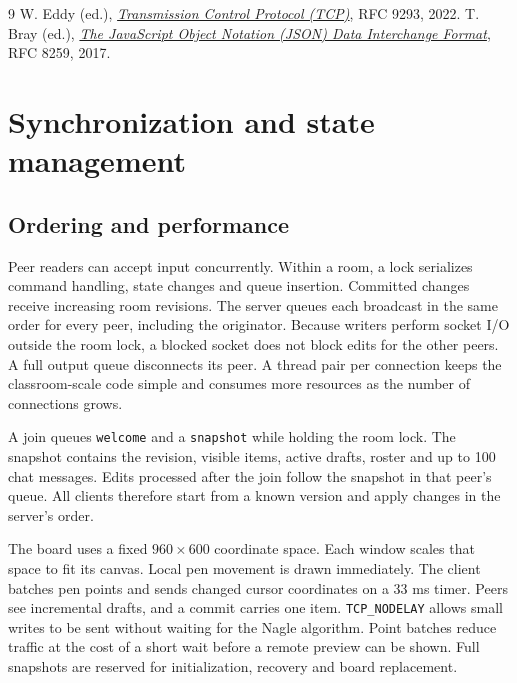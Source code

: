\documentclass[11pt,a4paper]{article}
\newcommand{\code}[1]{\texttt{#1}}
\begin{document}
{\small
\renewcommand{\refname}{Protocol references}
\begin{thebibliography}{9}
\setlength{\itemsep}{0pt}
 W. Eddy (ed.), \href{https://www.rfc-editor.org/rfc/rfc9293}{\emph{Transmission Control Protocol (TCP)}}, RFC 9293, 2022.
 T. Bray (ed.), \href{https://www.rfc-editor.org/rfc/rfc8259}{\emph{The JavaScript Object Notation (JSON) Data Interchange Format}}, RFC 8259, 2017.
\end{thebibliography}
}

\clearpage
\section{Synchronization and state management}

\subsection{Ordering and performance}

Peer readers can accept input concurrently. Within a room, a lock serializes command handling, state changes and queue insertion. Committed changes receive increasing room revisions. The server queues each broadcast in the same order for every peer, including the originator. Because writers perform socket I/O outside the room lock, a blocked socket does not block edits for the other peers. A full output queue disconnects its peer. A thread pair per connection keeps the classroom-scale code simple and consumes more resources as the number of connections grows.

A join queues \code{welcome} and a \code{snapshot} while holding the room lock. The snapshot contains the revision, visible items, active drafts, roster and up to 100 chat messages. Edits processed after the join follow the snapshot in that peer's queue. All clients therefore start from a known version and apply changes in the server's order.

The board uses a fixed $960\times600$ coordinate space. Each window scales that space to fit its canvas. Local pen movement is drawn immediately. The client batches pen points and sends changed cursor coordinates on a 33 ms timer. Peers see incremental drafts, and a commit carries one item. \code{TCP\_NODELAY} allows small writes to be sent without waiting for the Nagle algorithm. Point batches reduce traffic at the cost of a short wait before a remote preview can be shown. Full snapshots are reserved for initialization, recovery and board replacement.
\end{document}
